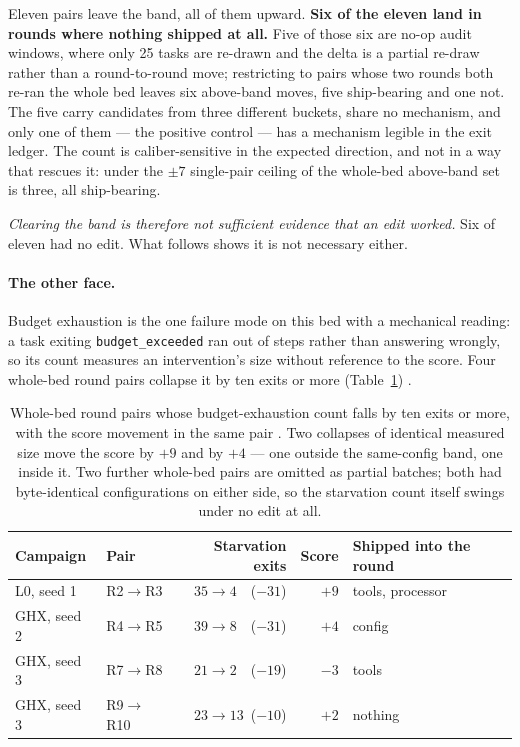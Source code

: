 Eleven pairs leave the band, all of them upward. \textbf{Six of the eleven
land in rounds where nothing shipped at all.} Five of those six are no-op
audit windows, where only 25 tasks are re-drawn and the delta is a partial
re-draw rather than a round-to-round move; restricting to pairs whose two
rounds both re-ran the whole bed leaves six above-band moves, five
ship-bearing and one not. The five carry candidates from three different
buckets, share no mechanism, and only one of them --- the positive control
--- has a mechanism legible in the exit ledger. The count is
caliber-sensitive in the expected direction, and not in a way that rescues
it: under
the $\pm 7$ single-pair ceiling of  the whole-bed above-band set is
three, all ship-bearing.

\emph{Clearing the band is therefore not sufficient evidence that an edit
worked.} Six of eleven had no edit. What follows shows it is not necessary
either.

\paragraph{The other face.} Budget exhaustion is the one failure mode on
this bed with a mechanical reading: a task exiting \texttt{budget\_exceeded}
ran out of steps rather than answering wrongly, so its count measures an
intervention's size without reference to the score. Four whole-bed round
pairs collapse it by ten exits or more (Table~\ref{tab:starvation})
.

\begin{table}[htbp]
\centering\small
\begin{tabular}{llrrl}
\toprule
Campaign & Pair & Starvation exits & Score & Shipped into the round \\
\midrule
L0, seed 1  & R2$\to$R3  & $35 \to 4$\ \ ($-31$)  & $+9$ & tools, processor \\
GHX, seed 2 & R4$\to$R5  & $39 \to 8$\ \ ($-31$)  & $+4$ & config \\
GHX, seed 3 & R7$\to$R8  & $21 \to 2$\ \ ($-19$)  & $-3$ & tools \\
GHX, seed 3 & R9$\to$R10 & $23 \to 13$\ ($-10$)   & $+2$ & nothing \\
\bottomrule
\end{tabular}
\caption[Starvation collapses and what the score did with them]{Whole-bed
round pairs whose budget-exhaustion count falls by ten exits or more, with
the score movement in the same pair . Two collapses of identical
measured size move the score by $+9$ and by $+4$ --- one outside the
same-config band, one inside it. Two further whole-bed pairs are omitted as
partial batches; both had byte-identical configurations on either side, so
the starvation count itself swings under no edit at all.}
\label{tab:starvation}
\end{table}

